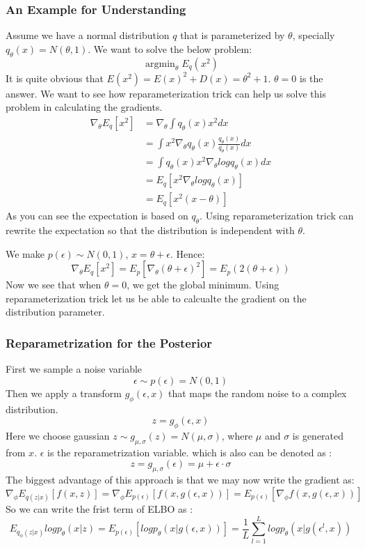 \documentclass{article}
\begin{document}
\subsubsection{An Example for Understanding} 
Assume we have a normal distribution $q$ that is parameterized by $\theta$, specially $q_{\theta}(x)=N(\theta,1)$. We want to solve the below problem:
$$\mathop{\arg\min}_{\theta} E_{q}(x^{2})$$
It is quite obvious that $E(x^{2})=E(x)^{2}+D(x)=\theta^{2}+1$. $\theta=0$ is the answer. We want to see how reparameterization trick can help us solve this problem in calculating the gradients. 
\begin{align*}
\nabla_{\theta}E_{q}[x^{2}]&=\nabla_{\theta} \int q_{\theta}(x)x^{2}dx \\
&=  \int x^{2} \nabla_{\theta}q_{\theta}(x) \frac{q_{\theta}(x)}{q_{\theta}(x)} dx \\
&= \int q_{\theta}(x) x^{2} \nabla_{\theta} log q_{\theta}(x) dx \\
&= E_{q}[x^{2}\nabla_{\theta} logq_{\theta}(x)] \\
&= E_{q}[x^{2}(x-\theta)]
\end{align*}
As you can see the expectation is based on $q_{\theta}$. Using reparameterization trick can rewrite the expectation so that the distribution is independent with $\theta$. 

We make $p(\epsilon) \sim N (0,1)$, $x=\theta+\epsilon$. Hence: 
$$\nabla_{\theta}E_{q}[x^{2}]=E_{p}[\nabla_{\theta}(\theta+\epsilon)^{2}]=E_{p}(2(\theta+\epsilon))$$
Now we see that when $\theta=0$, we get the global minimum. Using reparameterization trick let us be able to calcualte the gradient on the distribution parameter.

\subsubsection{Reparametrization for the Posterior } 
First we sample a noise variable 
$$\epsilon \sim p(\epsilon)= N(0,1)$$
Then we apply a transform $g_{\phi}(\epsilon,x)$ that maps the random noise to a complex distribution. 
$$z=g_{\phi}(\epsilon,x)$$
Here we choose gaussian $z\sim g_{\mu,\sigma}(z)=N(\mu,\sigma)$, where $\mu$ and $\sigma$ is generated from $x$. $\epsilon$ is the reparametrization variable. which is also can be denoted as :
$$z=g_{\mu,\sigma}(\epsilon)=\mu+\epsilon \cdot \sigma$$
The biggest advantage of this approach is that we may now write the gradient as:
$$\nabla_{\phi}E_{q(z|x)}[f(x,z)]=\nabla_{\phi}E_{p(\epsilon)}[f(x,g(\epsilon,x))]=E_{p(\epsilon)}[\nabla_{\phi}f(x,g(\epsilon,x))]$$
So we can write the frist term of ELBO as :
$$E_{q_{\phi}(z|x)}logp_{\theta}(x|z)=E_{p(\epsilon)}[logp_{\theta}(x|g(\epsilon,x))]=\frac{1}{L}\sum_{l=1}^{L}logp_{\theta}(x|g(\epsilon^{l},x)) $$
\end{document}
